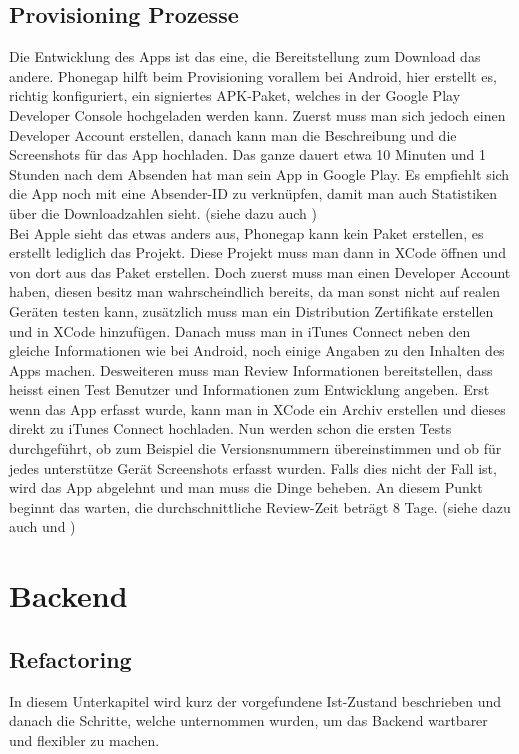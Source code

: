 \subsection{ Provisioning Prozesse}
Die Entwicklung des Apps ist das eine, die Bereitstellung zum Download das andere. Phonegap hilft beim Provisioning vorallem bei Android, hier erstellt es, richtig konfiguriert, ein signiertes APK-Paket, welches in der Google Play Developer Console hochgeladen werden kann. Zuerst muss man sich jedoch einen Developer Account erstellen, danach kann man die Beschreibung und die Screenshots für das App hochladen. Das ganze dauert etwa 10 Minuten und 1 Stunden nach dem Absenden hat man sein App in Google Play. Es empfiehlt sich die App noch mit eine Absender-ID zu verknüpfen, damit man auch Statistiken über die Downloadzahlen sieht. (siehe dazu auch \cite{android_prov})\\
Bei Apple sieht das etwas anders aus, Phonegap kann kein Paket erstellen, es erstellt lediglich das Projekt. Diese Projekt muss man dann in XCode öffnen und von dort aus das Paket erstellen. Doch zuerst muss man einen Developer Account haben, diesen besitz man wahrscheindlich bereits, da man sonst nicht auf realen Geräten testen kann, zusätzlich muss man ein Distribution Zertifikate erstellen und in XCode hinzufügen. Danach muss man in iTunes Connect neben den gleiche Informationen wie bei Android, noch einige Angaben zu den Inhalten des Apps machen. Desweiteren muss man Review Informationen bereitstellen, dass heisst einen Test Benutzer und Informationen zum Entwicklung angeben. Erst wenn das App erfasst wurde, kann man in XCode ein Archiv erstellen und dieses direkt zu iTunes Connect hochladen. Nun werden schon die ersten Tests durchgeführt, ob zum Beispiel die Versionsnummern übereinstimmen und ob für jedes unterstütze Gerät Screenshots erfasst wurden. Falls dies nicht der Fall ist, wird das App abgelehnt und man muss die Dinge beheben. An diesem Punkt beginnt das warten, die durchschnittliche Review-Zeit beträgt 8 Tage. (siehe dazu auch \cite{apple_prov_apple} und \cite{apple_prov_ralf})

\FloatBarrier
\section{Backend}\label{impl_backend}

\subsection{Refactoring}
In diesem Unterkapitel wird kurz der vorgefundene Ist-Zustand beschrieben und danach die Schritte, welche unternommen wurden, um das Backend wartbarer und flexibler zu machen.

